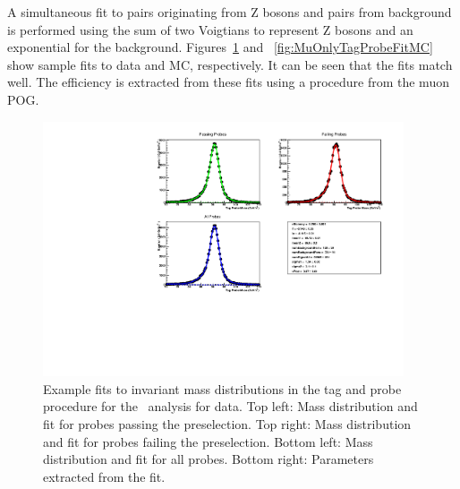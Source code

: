 A simultaneous fit to pairs originating from Z bosons and pairs from background is performed using the
sum of two Voigtians to represent Z bosons and an exponential for the background.
Figures~\ref{fig:MuOnlyTagProbeFitData} and ~\ref{fig:MuOnlyTagProbeFitMC} show sample fits to data and MC, respectively.
It can be seen that the fits match well. The efficiency is extracted from these fits using a procedure from the muon POG.

\begin{figure}
 \begin{center}
  \includegraphics[width=0.95\textwidth]{figures/muonly/FitCanvasDataPtBin0}
 \end{center}
 \caption[Example fits to invariant mass distributions
in the tag and probe procedure for the \muononly\ analysis for data.]
{Example fits to invariant mass distributions
in the tag and probe procedure for the \muononly\ analysis for data.
Top left: Mass distribution and fit for probes passing the preselection. Top right: Mass distribution and fit for probes failing the preselection.
Bottom left: Mass distribution and fit for all probes. Bottom right: Parameters extracted from the fit.}
    \label{fig:MuOnlyTagProbeFitData}
\end{figure}

